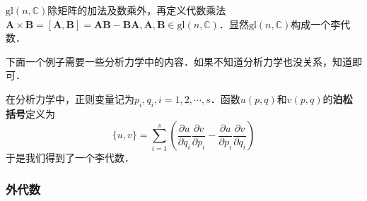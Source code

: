 \begin{example}{}
$\mathrm{gl}(n, \mathbb C)$除矩阵的加法及数乘外，再定义代数乘法$\mathbf A\times \mathbf B=[\mathbf A, \mathbf B] = \mathbf A \mathbf B - \mathbf B\mathbf A, \mathbf A, \mathbf B\in \mathrm{gl}(n, \mathbb C)$．显然$\mathrm{gl}(n,\mathbb C)$构成一个李代数．
\end{example}


下面一个例子需要一些分析力学中的内容．如果不知道分析力学也没关系，知道即可．
\begin{example}{}
在分析力学中，正则变量记为$p_i,q_i, i=1,2,\cdots, s$．函数$u(p,q)$和$v(p, q)$的\textbf{泊松括号}定义为\begin{equation}
\{u, v\}=\sum_{i=1}^{s}\left(\frac{\partial u}{\partial q_{i}} \frac{\partial v}{\partial p_{i}}-\frac{\partial u}{\partial p_{i}} \frac{\partial v}{\partial q_{i}}\right)
\end{equation}
于是我们得到了一个李代数．




\end{example}

\subsubsection{外代数}


